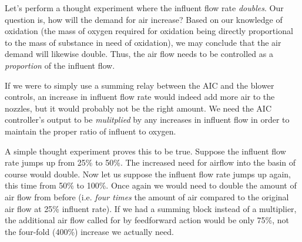 
Let's perform a thought experiment where the influent flow rate {\it doubles}.  Our question is, how will the demand for air increase?  Based on our knowledge of oxidation (the mass of oxygen required for oxidation being directly proportional to the mass of substance in need of oxidation), we may conclude that the air demand will likewise double.  Thus, the air flow needs to be controlled as a {\it proportion} of the influent flow.

\vskip 10pt

If we were to simply use a summing relay between the AIC and the blower controls, an increase in influent flow rate would indeed add more air to the nozzles, but it would probably not be the right amount.  We need the AIC controller's output to be {\it mulitplied} by any increases in influent flow in order to maintain the proper ratio of influent to oxygen.

A simple thought experiment proves this to be true.  Suppose the influent flow rate jumps up from 25\% to 50\%.  The increased need for airflow into the basin of course would double.  Now let us suppose the influent flow rate jumps up again, this time from 50\% to 100\%.  Once again we would need to double the amount of air flow from before (i.e. {\it four times} the amount of air compared to the original air flow at 25\% influent rate).  If we had a summing block instead of a multiplier, the additional air flow called for by feedforward action would be only 75\%, not the four-fold (400\%) increase we actually need.




